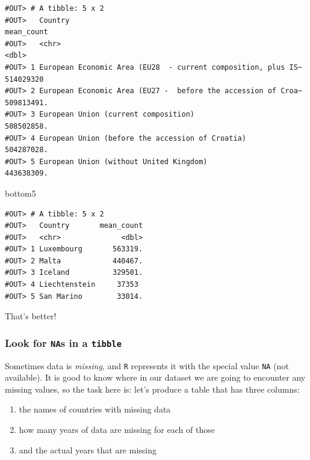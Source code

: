 \documentclass[]{book}
\newenvironment{Shaded}{\begin{snugshade}}{\end{snugshade}}
\newcommand{\NormalTok}[1]{#1}
\providecommand{\tightlist}{%
  \setlength{\itemsep}{0pt}\setlength{\parskip}{0pt}}
\theoremstyle{definition}
\theoremstyle{definition}
\theoremstyle{definition}
\theoremstyle{remark}
\begin{document}
\begin{verbatim}
#OUT> # A tibble: 5 x 2
#OUT>   Country                                                       mean_count
#OUT>   <chr>                                                              <dbl>
#OUT> 1 European Economic Area (EU28  - current composition, plus IS~ 514029320 
#OUT> 2 European Economic Area (EU27 -  before the accession of Croa~ 509813491.
#OUT> 3 European Union (current composition)                          508502858.
#OUT> 4 European Union (before the accession of Croatia)              504287028.
#OUT> 5 European Union (without United Kingdom)                       443638309.
\end{verbatim}

\begin{Shaded}
\begin{Highlighting}[]
\NormalTok{bottom5}
\end{Highlighting}
\end{Shaded}

\begin{verbatim}
#OUT> # A tibble: 5 x 2
#OUT>   Country       mean_count
#OUT>   <chr>              <dbl>
#OUT> 1 Luxembourg       563319.
#OUT> 2 Malta            440467.
#OUT> 3 Iceland          329501.
#OUT> 4 Liechtenstein     37353 
#OUT> 5 San Marino        33014.
\end{verbatim}

That's better!

\subsubsection*{\texorpdfstring{Look for \texttt{NA}s in a
\texttt{tibble}}{Look for NAs in a tibble}}\label{look-for-nas-in-a-tibble}

Sometimes data is \emph{missing}, and \texttt{R} represents it with the
special value \texttt{NA} (not available). It is good to know where in
our dataset we are going to encounter any missing values, so the task
here is: let's produce a table that has three columns:

\begin{enumerate}
\def\labelenumi{\arabic{enumi}.}
\tightlist
\item
  the names of countries with missing data
\item
  how many years of data are missing for each of those
\item
  and the actual years that are missing
\end{enumerate}
\end{document}
